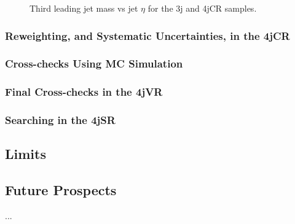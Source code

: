 \begin{figure}[!ht]
  \centering
  

    
  \caption{Third leading jet mass vs jet $\eta$ for the 3j and 4jCR samples.}
           
  \label{fig:search:search:kincorrelations:meta2}
\end{figure}

















\subsubsection{Reweighting, and Systematic Uncertainties, in the 4jCR}





\subsubsection{Cross-checks Using MC Simulation}

\subsubsection{Final Cross-checks in the 4jVR}


\subsubsection{Searching in the 4jSR}

	\subsection{Limits}
	\subsection{Future Prospects}
		...